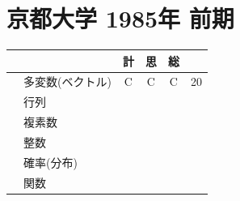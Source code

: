 \documentclass[../main.tex]{subfiles}
\begin{document}
\section*{京都大学 1985年 前期}
\begin{center}
  \begin{tabular}{|c|l|c|c|c|c|}
    \hline
    \multicolumn{2}{|c|}{} & 計 & 思 & 総 & \\
    \hline
    [1] & 多変数(ベクトル) & C & C & C & 20 \\
    \hline
    [2] & 行列 & & & & \\
    \hline
    [3] & 複素数 & & & & \\
    \hline
    [4] & 整数 & & & & \\
    \hline
    [5] & 確率(分布) & & & & \\
    \hline
    [6] & 関数 & & & & \\
    \hline
  \end{tabular}
\end{center}
\end{document}
